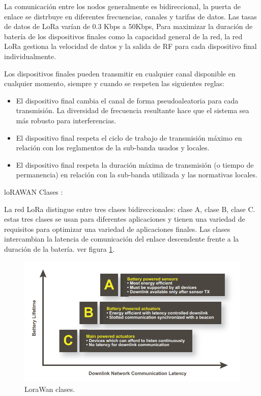 La comunicación entre los nodos generalmente es bidireccional, la puerta de enlace se distrbuye en diferentes frecuencias, canales y tarifas de datos. Las tasas de datos de LoRa varían de 0.3 Kbps a 50Kbps, Para  maximizar la duración de batería de los dispositivos finales como la capacidad general de la red, la red LoRa gestiona la velocidad de datos y la salida de RF para cada dispositivo final individualmente\cite{Specification2015}.



Los dispositivos finales pueden transmitir en cualquier canal disponible en cualquier momento, siempre y cuando se respeten las siguientes reglas:
\begin{itemize}
    \item El dispositivo final cambia el canal de forma pseudoaleatoria para cada  transmisión. La diversidad de frecuencia resultante hace que el sistema sea más robusto para interferencias.
    \item El dispositivo final respeta el ciclo de trabajo de transmisión máximo en relación con los reglamentos de la sub-banda usados y locales.
    \item El dispositivo final respeta la duración máxima de transmisión (o tiempo de permanencia) en relación con la sub-banda utilizada y las normativas locales.
\end{itemize}



loRAWAN Clases :

La red  LoRa distingue entre  tres clases bidireccionales: clase A, clase B, clase C. estas tres clases se usan para diferentes aplicaciones y tienen una variedad de requisitos para optimizar una variedad de aplicaciones finales. Las clases intercambian la latencia de comunicación del enlace descendente frente a la duración de la batería. ver figura \ref{fig:Loracomparacionclases}.

\begin{figure}[h]
	\centering
	\includegraphics[scale=.45]{./Figures/Loracomparacionclases.PNG}
	\caption{LoraWan clases\cite{LoRaAlliance2015}.}
	\label{fig:Loracomparacionclases}
\end{figure}


